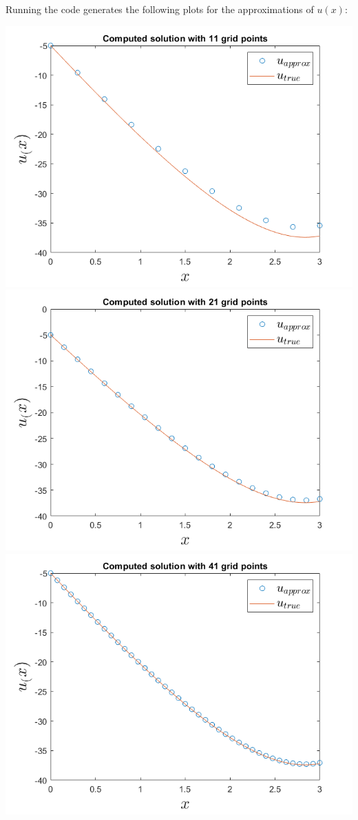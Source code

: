 \documentclass{article}
\begin{document}
Running the code generates the following plots for the approximations of $u(x)$:
\begin{center}
    \includegraphics[scale = 0.4]{bvp2Mod_11.png}
    \includegraphics[scale = 0.4]{bvp2Mod_21.png}
    \newline\newline
    \includegraphics[scale = 0.4]{bvp2Mod_41.png}

\end{center}
\end{document}
